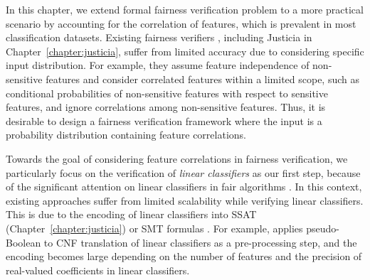 	In this chapter, we extend formal fairness verification problem to a more practical scenario by accounting for the correlation of features, which is prevalent in most classification datasets. Existing fairness verifiers \cite{albarghouthi2017fairsquare,bastani2019probabilistic}, including Justicia in Chapter~\ref{chapter:justicia}, suffer from limited accuracy due to considering specific input distribution. For example, they assume feature independence of non-sensitive features and consider correlated features within a limited scope, such as conditional probabilities of non-sensitive features with respect to sensitive features, and ignore correlations among non-sensitive features. Thus, it is desirable to design a fairness verification framework where the input is a probability distribution containing feature correlations.
	
	Towards the goal of considering feature correlations in fairness verification, we particularly focus on the verification of \textit{linear classifiers} as our first step, because of the significant attention on linear classifiers in fair algorithms \cite{pleiss2017fairness,zafar2017fairness,dressel2018accuracy, john2020verifying}. In this context, existing approaches suffer from limited scalability while verifying linear classifiers. This is due to the encoding of linear classifiers into SSAT (Chapter~\ref{chapter:justicia}) or SMT formulas \cite{albarghouthi2017fairsquare}. For example, {\justicia} applies pseudo-Boolean to CNF translation of linear classifiers as a pre-processing step, and the encoding becomes large depending on the number of features and the precision of real-valued coefficients in linear classifiers.
	
